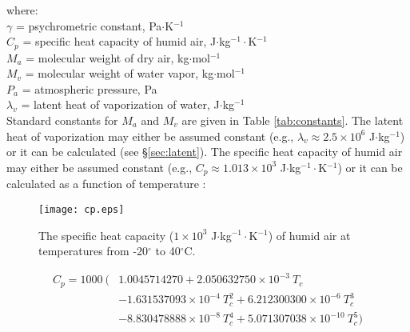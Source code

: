 \noindent where: \\
\indent $\gamma$ = psychrometric constant, Pa$\cdot$K$^{-1}$ \\
\indent $C_p$ = specific heat capacity of humid air, J$\cdot$kg$^{-1}\cdot$K$^{-1}$\\
\indent $M_a$ = molecular weight of dry air, kg$\cdot$mol$^{-1}$\\
\indent $M_v$ = molecular weight of water vapor, kg$\cdot$mol$^{-1}$\\
\indent $P_{a}$ = atmospheric pressure, Pa\\
\indent $\lambda_v$ = latent heat of vaporization of water, J$\cdot$kg$^{-1}$\\

\noindent Standard constants for $M_a$ and $M_v$ are given in Table \ref{tab:constants}. 
The latent heat of vaporization may either be assumed constant (e.g., $\lambda_v \approx 2.5\times 10^6$ J$\cdot$kg$^{-1}$) or it can be calculated (see \S \ref{sec:latent}). 
The specific heat capacity of humid air may either be assumed constant (e.g., $C_p \approx 1.013\times 10^3$ J$\cdot$kg$^{-1}\cdot$K$^{-1}$) or it can be calculated as a function of temperature \parencite[Eq. 47]{tsilingiris08}:

\begin{figure}[ht!]
    \texttt{[image: cp.eps]}
    \caption{The specific heat capacity ($1\times 10^3$ J$\cdot$kg$^{-1}\cdot$K$^{-1}$) of humid air at temperatures from -20$^{\circ}$ to 40$^{\circ}$C.}
    \label{fig:cp}
\end{figure}

\begin{equation}
\label{eq:cp}
	\begin{split}
		C_p = 1000\: ( &1.0045714270+2.050632750\times 10^{-3}\: T_c\\
		                              &-1.631537093\times 10^{-4}\: T_c^{2} 
		                                 +6.212300300\times 10^{-6}\: T_c^{3}\\
		                              &-8.830478888\times 10^{-8}\: T_c^{4} 
		                                 +5.071307038\times 10^{-10}\: T_c^{5} )
	\end{split}
\end{equation}


